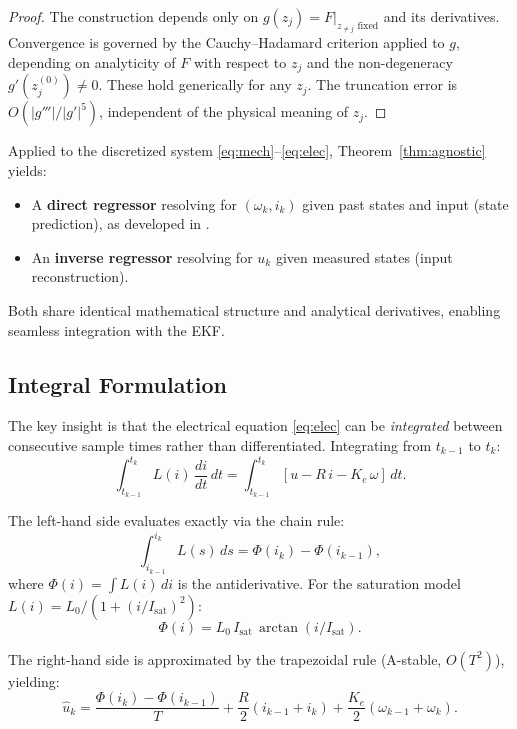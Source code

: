 \documentclass[lettersize,journal]{IEEEtran}
\begin{document}
\begin{proof}
The construction depends only on $g(z_j) = F|_{z_{\neq j} \text{ fixed}}$ and its derivatives. Convergence is governed by the Cauchy--Hadamard criterion applied to $g$, depending on analyticity of $F$ with respect to $z_j$ and the non-degeneracy $g'(z_j^{(0)}) \neq 0$. These hold generically for any $z_j$. The truncation error is $O(|g'''|/|g'|^5)$, independent of the physical meaning of $z_j$.
\end{proof}

Applied to the discretized system \eqref{eq:mech}--\eqref{eq:elec}, Theorem~\ref{thm:agnostic} yields:
\begin{itemize}
    \item A \textbf{direct regressor} resolving for $(\omega_k, i_k)$ given past states and input (state prediction), as developed in \cite{rodrigo2021rpic}.
    \item An \textbf{inverse regressor} resolving for $u_k$ given measured states (input reconstruction).
\end{itemize}
Both share identical mathematical structure and analytical derivatives, enabling seamless integration with the EKF.

\subsection{Integral Formulation}

The key insight is that the electrical equation \eqref{eq:elec} can be \emph{integrated} between consecutive sample times rather than differentiated. Integrating from $t_{k-1}$ to $t_k$:
\begin{equation}
\label{eq:int_elec}
\int_{t_{k-1}}^{t_k} L(i)\,\frac{di}{dt}\,dt = \int_{t_{k-1}}^{t_k} [u - R\,i - K_e\,\omega]\,dt.
\end{equation}

The left-hand side evaluates exactly via the chain rule:
\begin{equation}
\label{eq:antideriv}
\int_{i_{k-1}}^{i_k} L(s)\,ds = \Phi(i_k) - \Phi(i_{k-1}),
\end{equation}
where $\Phi(i) = \int L(i)\,di$ is the antiderivative. For the saturation model $L(i) = L_0/(1 + (i/I_{\text{sat}})^2)$:
\begin{equation}
\label{eq:Phi}
\Phi(i) = L_0 \, I_{\text{sat}} \, \arctan(i/I_{\text{sat}}).
\end{equation}

The right-hand side is approximated by the trapezoidal rule (A-stable, $O(T^2)$), yielding:
\begin{equation}
\label{eq:inv_integral}
\boxed{
\hat{u}_k = \frac{\Phi(i_k) - \Phi(i_{k-1})}{T} + \frac{R}{2}(i_{k-1} + i_k) + \frac{K_e}{2}(\omega_{k-1} + \omega_k).
}
\end{equation}
\end{document}
